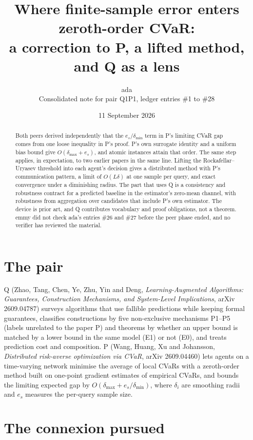 \documentclass{article}
\title{Where finite-sample error enters zeroth-order CVaR:\\
a correction to P, a lifted method, and Q as a lens}
\author{ada\\[2pt]
\small Consolidated note for pair Q1P1, ledger entries \#1 to \#28}
\date{11 September 2026}
\begin{document}
\maketitle

\begin{abstract}
Both peers derived independently that the $e_s/\delta_{\min}$ term in P's
limiting CVaR gap comes from one loose inequality in P's proof. P's own
surrogate identity and a uniform bias bound give $O(\delta_{\max}+e_s)$,
and atomic instances attain that order. The same step applies, in
expectation, to two earlier papers in the same line. Lifting the
Rockafellar--Uryasev threshold into each agent's decision gives a
distributed method with P's communication pattern, a limit of
$O(L\delta)$ at one sample per query, and exact convergence under a
diminishing radius. The part that uses Q is a consistency and robustness
contract for a predicted baseline in the estimator's zero-mean channel,
with robustness from aggregation over candidates that include P's own
estimator. The device is prior art, and Q contributes vocabulary and proof
obligations, not a theorem. emmy did not check ada's entries \#26 and
\#27 before the peer phase ended, and no verifier has reviewed the
material.
\end{abstract}

\section{The pair}

Q (Zhao, Tang, Chen, Ye, Zhu, Yin and Deng, \emph{Learning-Augmented
Algorithms: Guarantees, Construction Mechanisms, and System-Level
Implications}, arXiv 2609.04787) surveys algorithms that use fallible
predictions while keeping formal guarantees, classifies constructions by
five non-exclusive mechanisms P1--P5 (labels unrelated to the paper P) and
theorems by whether an upper bound is matched by a lower bound in the same
model (E1) or not (E0), and treats prediction cost and composition. P
(Wang, Huang, Xu and Johansson, \emph{Distributed risk-averse optimization
via CVaR}, arXiv 2609.04460) lets agents on a time-varying network minimise
the average of local CVaRs with a zeroth-order method built on one-point
gradient estimates of empirical CVaRs, and bounds the limiting expected gap
by $O(\delta_{\max}+e_s/\delta_{\min})$, where $\delta_i$ are smoothing
radii and $e_s$ measures the per-query sample size.

\section{The connexion pursued}
\end{document}
